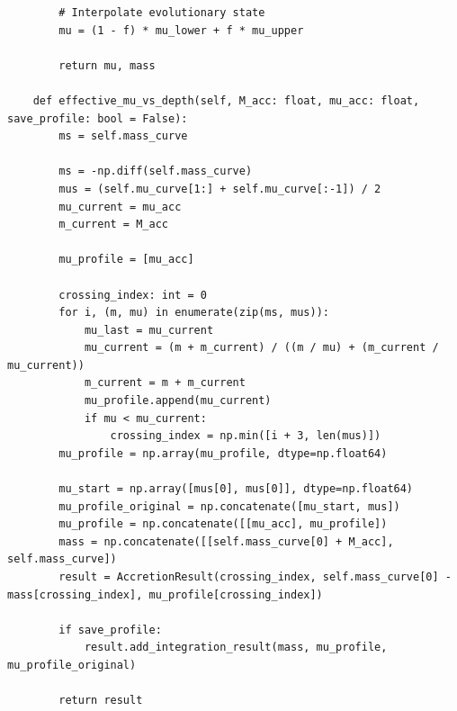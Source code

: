 \documentclass[a4paper,10pt]{article}
\begin{document}
\begin{verbatim}
        # Interpolate evolutionary state
        mu = (1 - f) * mu_lower + f * mu_upper

        return mu, mass

    def effective_mu_vs_depth(self, M_acc: float, mu_acc: float, save_profile: bool = False):
        ms = self.mass_curve

        ms = -np.diff(self.mass_curve)
        mus = (self.mu_curve[1:] + self.mu_curve[:-1]) / 2
        mu_current = mu_acc
        m_current = M_acc

        mu_profile = [mu_acc]

        crossing_index: int = 0
        for i, (m, mu) in enumerate(zip(ms, mus)):
            mu_last = mu_current
            mu_current = (m + m_current) / ((m / mu) + (m_current / mu_current))
            m_current = m + m_current
            mu_profile.append(mu_current)
            if mu < mu_current:
                crossing_index = np.min([i + 3, len(mus)])
        mu_profile = np.array(mu_profile, dtype=np.float64)

        mu_start = np.array([mus[0], mus[0]], dtype=np.float64)
        mu_profile_original = np.concatenate([mu_start, mus])
        mu_profile = np.concatenate([[mu_acc], mu_profile])
        mass = np.concatenate([[self.mass_curve[0] + M_acc], self.mass_curve])
        result = AccretionResult(crossing_index, self.mass_curve[0] -mass[crossing_index], mu_profile[crossing_index])

        if save_profile:
            result.add_integration_result(mass, mu_profile, mu_profile_original)

        return result
\end{verbatim}
\end{document}
